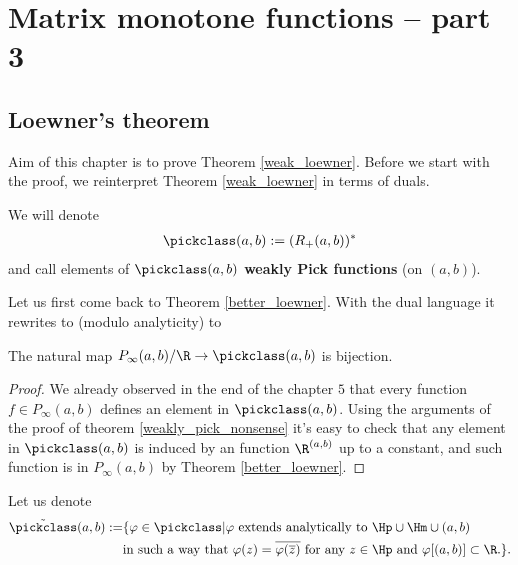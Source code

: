 \chapter{Matrix monotone functions -- part 3}

\section{Loewner's theorem}

Aim of this chapter is to prove Theorem \ref{weak_loewner}. Before we start with the proof, we reinterpret Theorem \ref{weak_loewner} in terms of duals.

\begin{maar}
	We will denote
	\begin{align*}
		\pickclass(a, b) := (R_{+}(a, b))^{*}
	\end{align*}
	and call elements of $\pickclass(a, b)$ \textbf{weakly Pick functions} (on $(a, b)$).
\end{maar}

Let us first come back to Theorem \ref{better_loewner}. With the dual language it rewrites to (modulo analyticity) to
\begin{lause}\label{bester_loewner}
	The natural map $P_{\infty}(a, b)/\R \to \pickclass(a, b)$ is bijection.
\end{lause}
\begin{proof}
	We already observed in the end of the chapter $5$ that every function $f \in P_{\infty}(a, b)$ defines an element in $\pickclass(a, b)$. Using the arguments of the proof of theorem \ref{weakly_pick_nonsense} it's easy to check that any element in $\pickclass(a, b)$ is induced by an function $\R^{(a, b)}$ up to a constant, and such function is in $P_{\infty}(a, b)$ by Theorem \ref{better_loewner}.
\end{proof}

Let us denote
\begin{align*}
	\tilde{\pickclass}(a, b) :=& \{\varphi \in \pickclass | \text{$\varphi$ extends analytically to $\Hp \cup \Hm \cup (a, b)$} \\
	&\text{in such a way that $\varphi(z) = \overline{\varphi(\overline{z})}$ for any $z \in \Hp$ and $\varphi[(a, b)] \subset \R.$}\}.
\end{align*}

